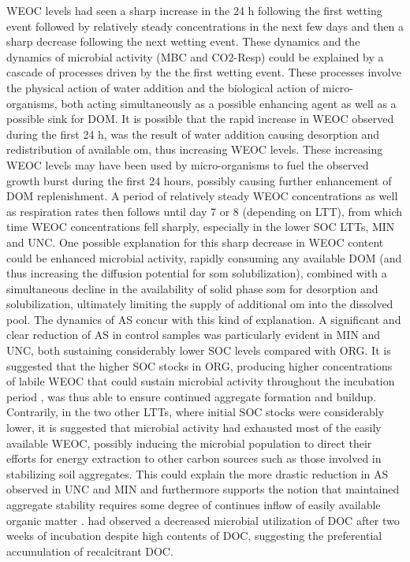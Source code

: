 	WEOC levels had seen a sharp increase in the 24 h following the first wetting event followed by relatively steady concentrations in the next few days and then a sharp decrease following the next wetting event.
	These  dynamics and the dynamics of microbial activity (MBC and CO2-Resp) could be explained by a cascade of processes driven by the the first wetting event. These processes involve the physical action of water addition and the biological action of micro-organisms, both acting simultaneously as a possible enhancing agent as well as a possible sink for DOM. It is possible that the rapid increase in WEOC observed during the first 24 h, was the result of water addition causing desorption and redistribution of available \gls{om}, thus increasing WEOC levels. These increasing WEOC levels may have been used by micro-organisms to fuel the observed growth burst during the first 24 hours, possibly causing further enhancement of DOM replenishment.  A period of relatively steady WEOC concentrations as well as respiration rates then follows until day 7 or 8 (depending on LTT), from which time WEOC concentrations fell sharply, especially in the lower SOC LTTs, MIN and UNC.
	One possible explanation for this sharp decrease in WEOC content could be enhanced microbial activity, rapidly consuming any available DOM (and thus increasing the diffusion potential for \gls{som} solubilization), combined with a simultaneous decline in the availability of solid phase \gls{som} for desorption and solubilization, ultimately limiting the supply of additional \gls{om} into the dissolved pool.
	The dynamics of AS concur with this kind of explanation. A significant and clear reduction of AS in control samples was particularly evident in MIN and UNC, both sustaining considerably lower SOC levels compared with ORG. It is suggested that the higher SOC stocks in ORG, producing higher concentrations of labile WEOC that could sustain microbial activity throughout the incubation period , was thus able to ensure continued aggregate formation and buildup. Contrarily, in the two other LTTs, where initial SOC stocks were considerably lower, it is suggested that microbial activity had exhausted most of the easily available WEOC, possibly inducing the microbial population to direct their efforts for energy extraction to other carbon sources such as those involved in stabilizing soil aggregates. This could explain the more drastic reduction in AS observed in UNC and MIN and furthermore supports the notion that maintained aggregate stability requires some degree of continues inflow of easily available organic matter \citep{golchin1994}. \citet{cook1992} had observed a decreased microbial utilization of DOC after two weeks of incubation despite high contents of DOC, suggesting the preferential accumulation of recalcitrant DOC.\\
